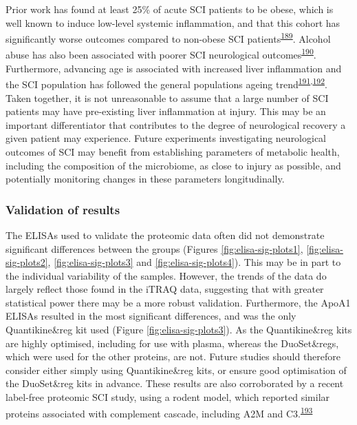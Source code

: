 \documentclass[
]{article}
\begin{document}
Prior work has found at least 25\% of acute SCI patients to be obese, which is well known to induce low-level systemic inflammation, and that this cohort has significantly worse outcomes compared to non-obese SCI patients\textsuperscript{\protect\hyperlink{ref-stenson_obesity_2011}{189}}.
Alcohol abuse has also been associated with poorer SCI neurological outcomes\textsuperscript{\protect\hyperlink{ref-elliot_alcohol_2002}{190}}.
Furthermore, advancing age is associated with increased liver inflammation and the SCI population has followed the general populations ageing trend\textsuperscript{\protect\hyperlink{ref-bertolotti_nonalcoholic_2014}{191},\protect\hyperlink{ref-chen_changing_2016}{192}}.
Taken together, it is not unreasonable to assume that a large number of SCI patients may have pre-existing liver inflammation at injury.
This may be an important differentiator that contributes to the degree of neurological recovery a given patient may experience.
Future experiments investigating neurological outcomes of SCI may benefit from establishing parameters of metabolic health, including the composition of the microbiome, as close to injury as possible, and potentially monitoring changes in these parameters longitudinally.

\hypertarget{validation-of-results}{%
\subsubsection{Validation of results}\label{validation-of-results}}

The ELISAs used to validate the proteomic data often did not demonstrate significant differences between the groups (Figures \ref{fig:elisa-sig-plots1}, \ref{fig:elisa-sig-plots2}, \ref{fig:elisa-sig-plots3} and \ref{fig:elisa-sig-plots4}).
This may be in part to the individual variability of the samples.
However, the trends of the data do largely reflect those found in the iTRAQ data, suggesting that with greater statistical power there may be a more robust validation.
Furthermore, the ApoA1 ELISAs resulted in the most significant differences, and was the only Quantikine\&reg kit used (Figure \ref{fig:elisa-sig-plots3}).
As the Quantikine\&reg kits are highly optimised, including for use with plasma, whereas the DuoSet\&regs, which were used for the other proteins, are not.
Future studies should therefore consider either simply using Quantikine\&reg kits, or ensure good optimisation of the DuoSet\&reg kits in advance.
These results are also corroborated by a recent label-free proteomic SCI study, using a rodent model, which reported similar proteins associated with complement cascade, including A2M and C3.\textsuperscript{\protect\hyperlink{ref-yao_proteomics_2021}{193}}
\end{document}
